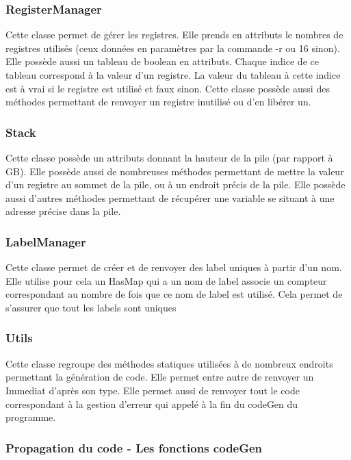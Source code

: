 \documentclass[12pt, a4paper, one side]{article}
\begin{document}
    \subsubsection{RegisterManager}

    Cette classe permet de gérer les registres. Elle prends en attributs le nombres de registres utilisés
    (ceux données en paramètres par la commande -r ou 16 sinon). Elle possède aussi un tableau de boolean
    en attributs. Chaque indice de ce tableau correspond à la valeur d'un registre. La valeur du tableau
    à cette indice est à vrai si le registre est utilisé et faux sinon. Cette classe possède aussi des
    méthodes permettant de renvoyer un registre inutilisé ou d'en libérer un.

    \subsubsection{Stack}

    Cette classe possède un attributs donnant la hauteur de la pile (par rapport à GB). Elle possède aussi
    de nombreuses méthodes permettant de mettre la valeur d'un registre au sommet de la pile, ou à un
    endroit précis de la pile. Elle possède aussi d'autres méthodes permettant de récupérer une variable
    se situant à une adresse précise dans la pile.

    \subsubsection{LabelManager}

    Cette classe permet de créer et de renvoyer des label uniques à partir d'un nom. Elle utilise pour cela un HasMap
    qui a un nom de label associe un compteur correspondant au nombre de fois que ce nom de label est utilisé. Cela
    permet de s'assurer que tout les labels sont uniques

    \subsubsection{Utils}

    Cette classe regroupe des méthodes statiques utilisées à de nombreux endroits permettant la génération
    de code. Elle permet entre autre de renvoyer un Immediat d'après son type. Elle permet aussi de renvoyer tout
    le code correspondant à la gestion d'erreur qui appelé à la fin du codeGen du programme.

    \subsubsection{Propagation du code - Les fonctions codeGen}
\end{document}
